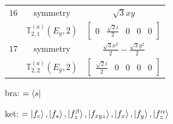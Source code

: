 \documentclass[fleqn,8pt,landscape]{jsarticle}
\begin{document}
\begin{longtable}{ccc}
$ 16 $ & $ \text{symmetry} $ & $ \sqrt{3} x y $ \\
$  $ & $ \mathbb{T}_{2,1}^{(a)}(E_{g},2) $ & $ \begin{bmatrix} 0 & \frac{\sqrt{2} i}{2} & 0 & 0 & 0 \end{bmatrix} $ \\ \hline
$ 17 $ & $ \text{symmetry} $ & $ \frac{\sqrt{3} x^{2}}{2} - \frac{\sqrt{3} y^{2}}{2} $ \\
$  $ & $ \mathbb{T}_{2,2}^{(a)}(E_{g},2) $ & $ \begin{bmatrix} \frac{\sqrt{2} i}{2} & 0 & 0 & 0 & 0 \end{bmatrix} $ \\ \hline
\end{longtable}
bra: $=\bra{s}$

\noindent
ket: $=\ket{f_{c}}, \ket{f_{s}}, \ket{f_{z}^{\beta}}, \ket{f_{xyz}}, \ket{f_{x}}, \ket{f_{y}}, \ket{f_{z}^{\alpha}}$
\renewcommand{\arraystretch}{1.6}
\end{document}
